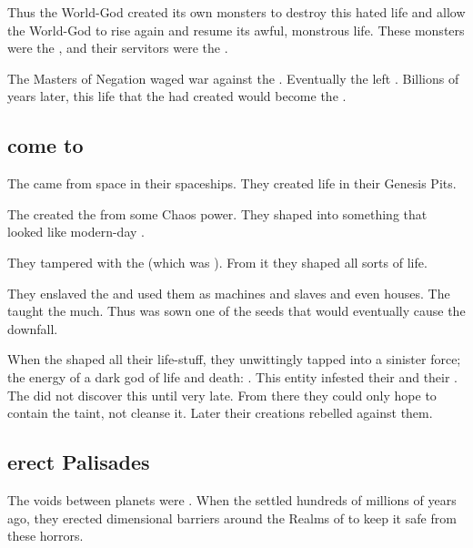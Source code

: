 Thus the World-God created its own monsters to destroy this hated life and allow the World-God to rise again and resume its awful, monstrous life.
These monsters were the , and their servitors were the .

The Masters of Negation waged war against the \voyagers. 
Eventually the \voyagers left \Miith. 
Billions of years later, this life that the \voyagers{} had created would become the \ophidians. 









\subsection{\Voyagers come to \Miith}
The \voyagers{} came from space in their spaceships. 
They created life in their Genesis Pits. 

The \voyagers{} created the  from some Chaos power. 
They shaped \Miith{} into something that looked like modern-day \Miith{}. 

They tampered with the \noggyal {} (which was ). 
From it they shaped all sorts of life. 

They enslaved the \noggyaleth and used them as machines and slaves and even houses.
The \voyagers taught the \noggyaleth much. 
Thus was sown one of the seeds that would eventually cause the \pps{\voyagers} downfall. 

When the \voyagers{} shaped all their life-stuff, they unwittingly tapped into a sinister force; the energy of a dark god of life and death: \KhothSell. 
This entity infested their \dweomers{} and their . 
The \voyagers{} did not discover this until very late. 
From there they could only hope to contain the taint, not cleanse it. 
Later their creations rebelled against them. 









\subsection{\Voyagers erect Palisades}
The voids between planets were .
When the \voyagers settled \Miith hundreds of millions of years ago, they erected dimensional barriers around the Realms of \Miith to keep it safe from these horrors.

